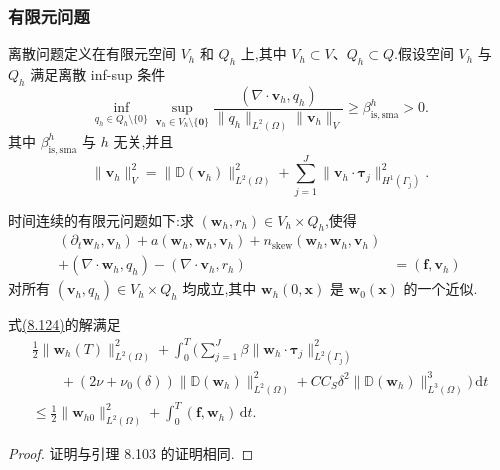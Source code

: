 \subsubsection{有限元问题}
\label{subsubsec:smagorinsky-finite-element-problem}

\begin{note}[有限元空间]
\label{note:smagorinsky-finite-element-spaces}
离散问题定义在有限元空间 $V_h$ 和 $Q_h$ 上,其中 $V_h\subset V$、$Q_h\subset Q$.假设空间 $V_h$ 与 $Q_h$ 满足离散 inf-sup 条件
\[
\inf_{q_h\in Q_h\setminus\{0\}}\sup_{\bm{v}_h\in V_h\setminus\{\bm{0}\}}
\frac{(\nabla\cdot\bm{v}_h,q_h)}
     {\|q_h\|_{L^2(\Omega)}\|\bm{v}_h\|_V}
\ge \beta_{\mathrm{is,sma}}^h>0.
\]
其中 $\beta_{\mathrm{is,sma}}^h$ 与 $h$ 无关,并且
\[
\|\bm{v}_h\|_V^2
=\|\mathbb{D}(\bm{v}_h)\|_{L^2(\Omega)}^2
 +\sum_{j=1}^J
       \|\bm{v}_h\cdot\symbf{\tau}_j\|_{H^1(\Gamma_j)}^2.
\]
\end{note}

\begin{note}[时间连续的有限元问题]
\label{note:smagorinsky-continuous-time-fem-problem}
时间连续的有限元问题如下:求 $(\bm{w}_h,r_h)\in V_h\times Q_h$,使得
\begin{equation}\label{eq:smagorinsky-continuous-time-fem-problem}
\begin{aligned}
 (\partial_t\bm{w}_h,\bm{v}_h)
 +a(\bm{w}_h,\bm{w}_h,\bm{v}_h)
 +n_{\mathrm{skew}}(\bm{w}_h,\bm{w}_h,\bm{v}_h)\\
 +(\nabla\cdot\bm{w}_h,q_h)
 -(\nabla\cdot\bm{v}_h,r_h)
 &=(\bm{f},\bm{v}_h)
\end{aligned}
\end{equation}
对所有 $(\bm{v}_h,q_h)\in V_h\times Q_h$ 均成立,其中 $\bm{w}_h(0,\bm{x})$ 是 $\bm{w}_0(\bm{x})$ 的一个近似.
\end{note}

\begin{lemma}[有限元解的能量不等式]
\label{lem:smagorinsky-fem-energy-inequality}
式\hyperref[eq:smagorinsky-continuous-time-fem-problem]{(8.124)}的解满足
\[
\begin{gathered}
 \frac12\|\bm{w}_h(T)\|_{L^2(\Omega)}^2
 +\int_0^T\Biggl(\sum_{j=1}^J\beta
       \|\bm{w}_h\cdot\symbf{\tau}_j\|_{L^2(\Gamma_j)}^2\\
 \qquad +(2\nu+\nu_0(\delta))
       \|\mathbb{D}(\bm{w}_h)\|_{L^2(\Omega)}^2
       +C C_S\delta^2
       \|\mathbb{D}(\bm{w}_h)\|_{L^3(\Omega)}^3\Biggr)\,\mathrm{d}t\\
 \le \frac12\|\bm{w}_{h0}\|_{L^2(\Omega)}^2
       +\int_0^T(\bm{f},\bm{w}_h)\,\mathrm{d}t.
\end{gathered}
\]
\begin{proof}
证明与引理 8.103 的证明相同.
\end{proof}
\end{lemma}

